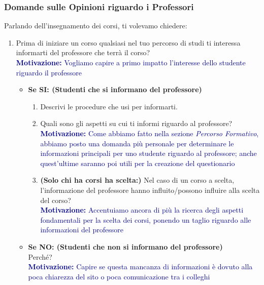 \subsubsection{Domande sulle Opinioni riguardo i Professori}
Parlando dell’insegnamento dei corsi, ti volevamo chiedere:
\begin{enumerate}
    \item Prima di iniziare un corso qualsiasi nel tuo percorso di studi ti interessa informarti del professore che terrà il corso?\\
    \textcolor{darkblue}{\textbf{Motivazione:} Vogliamo capire a primo impatto l'interesse dello studente riguardo il professore}
    \begin{itemize}
        \item \textbf{Se SI: (Studenti che si informano del professore)}
        \begin{enumerate}
            \item Descrivi le procedure che usi per informarti.
            \item Quali sono gli aspetti su cui ti informi riguardo al professore?\\
            \textcolor{darkblue}{\textbf{Motivazione:} Come abbiamo fatto nella sezione \textit{Percorso Formativo}, abbiamo posto una domanda più personale per determinare
            le informazioni principali per uno studente riguardo al professore; anche quest'ultime saranno poi utili per la creazione del questionario }
            \item \textbf{(Solo chi ha corsi ha scelta:)} Nel caso di un corso a scelta, l’informazione del professore hanno influito/possono influire alla scelta del corso?\\
            \textcolor{darkblue}{\textbf{Motivazione:} Accentuiamo ancora di più la ricerca degli aspetti fondamentali per la scelta dei corsi, ponendo un taglio riguardo alle informazioni del professore}
        \end{enumerate}
    
        \item \textbf{Se NO: (Studenti che non si informano del professore)}\\
        Perché?\\
        \textcolor{darkblue}{\textbf{Motivazione:} Capire se questa mancanza di informazioni è dovuto alla poca chiarezza del sito o poca comunicazione tra i colleghi}
    \end{itemize}


\end{enumerate}

